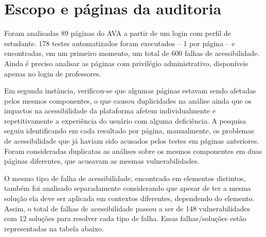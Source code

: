 \documentclass[
	12pt,				%
	openright,			%
	oneside,			%
	a4paper,			%
	chapter=TITLE,		%
	section=TITLE,		%
	subsection=TITLE,	%
	subsubsection=TITLE,%
	english,			%
	brazil				%
	]{abntex2}
\theoremstyle{definition}
\begin{document}
\section{Escopo e páginas da auditoria}

Foram analisadas 89 páginas do AVA a partir de um login com perfil de estudante. 178 testes automatizados foram executados – 1 por página – e encontradas, em um primeiro momento, um total de 600 falhas de acessibilidade. Ainda é preciso analisar as páginas com privilégio administrativo, disponíveis apenas no login de professores.

Em segunda instância, verificou-se que algumas páginas estavam sendo afetadas pelos mesmos componentes, o que causou duplicidades na análise ainda que os impactos na acessibilidade da plataforma afetem individualmente e repetitivamente a experiência do usuário com alguma deficiência. A pesquisa seguiu identificando em cada resultado por página, manualmente, os problemas de acessibilidade que já haviam sido acusados pelos testes em páginas anteriores. Foram consideradas duplicatas as análises sobre os mesmos componentes em duas páginas diferentes, que acusavam as mesmas vulnerabilidades.

O mesmo tipo de falha de acessibilidade, encontrado em elementos distintos, também foi analisado separadamente considerando que apesar de ter a mesma solução ela deve ser aplicada em contextos diferentes, dependendo do elemento. Assim, o total de falhas de acessibilidade passou a ser de 148 vulnerabilidades com 12 soluções para resolver cada tipo de falha. Essas falhas/soluções estão representadas na tabela abaixo.
\end{document}
